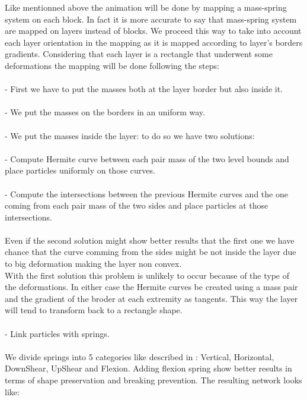 \documentclass[12pt, a4paper]{memoir} %
\begin{document}
Like mentionned above the animation will be done by mapping a mass-spring system on each block. In fact it is more accurate to say that mass-spring system are mapped on layers instead of blocks. We proceed this way to take into account each layer orientation in the mapping as it is mapped according to layer's borders gradients. Considering that each layer is a rectangle that underwent some deformations the mapping will be done following the steps:	\\\\		
\indent	- First we have to put the masses both at the layer border but also inside it.\\\\
\indent	- We put the masses on the borders in an uniform way.\\\\
\indent	- We put the masses inside the layer: to do so we have two solutions:\\\\
\indent \indent	- Compute Hermite curve between each pair mass of the two level bounds and place particles uniformly on those curves.\\\\
\indent \indent	- Compute the intersections between the previous Hermite curves and the one coming from each pair mass of the two sides and place particles at those intersections.\\\\
	Even if the second solution might show better results that the first one we have chance that the curve comming from the sides might be not inside the layer due to big deformation making the layer non convex. \\With the first solution this problem is unlikely to occur because of the type of the deformations. In either case the Hermite curves be created using a mass pair and the gradient of the broder at each extremity as tangents. This way the layer will tend to transform back to a rectangle shape.\\\\
\indent	- Link particles with springs. \\\\We divide springs into 5 categories like described in \citep{cloth}: Vertical, Horizontal, DownShear, UpShear and Flexion. Adding flexion spring show better results in terms of shape preservation and breaking prevention. The resulting network looks like:\\
	
\end{document}
